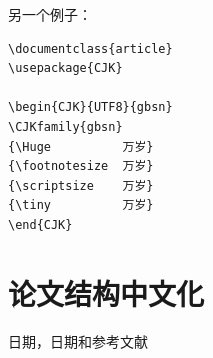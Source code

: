 另一个例子：
\begin{verbatim}
\documentclass{article}
\usepackage{CJK}

\begin{CJK}{UTF8}{gbsn}
\CJKfamily{gbsn}
{\Huge          万岁}
{\footnotesize  万岁}
{\scriptsize    万岁}
{\tiny          万岁}
\end{CJK}

\end{verbatim}


\section{论文结构中文化}
日期，日期和参考文献
\begin{shellcmd}
\renewcommand{\bibname}{\begin{center} \sffamily 参考文献 \end{center}}
\renewcommand{\today}{\number\year 年 \number\month 月 \number\day 日}
\renewcommand{\contentsname}{目录}
\end{shellcmd}


